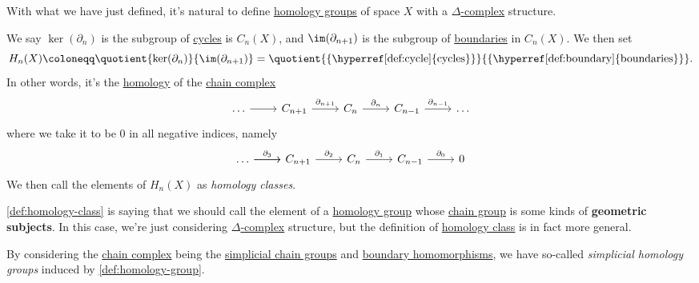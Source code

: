 With what we have just defined, it's natural to define \hyperref[def:homology-group]{homology groups} of space \(X\) with a \hyperref[def:delta-complex]{\(\Delta \)-complex}
structure.
\begin{definition}\label{def:homology-class}
	We say \(\ker  (\partial _{n} )\) is the subgroup of \hyperref[def:cycle]{cycles} is \(C_{n} (X)\), and \(\im (\partial_{n+1}) \) is the
	subgroup of \hyperref[def:boundary]{boundaries} in \(C_{n} (X)\). We then set
	\[
		H_{n} (X)\coloneqq \quotient{\ker  (\partial _{n} )}{\im  (\partial _{n+1})} = \quotient{\{\text{\hyperref[def:cycle]{cycles}}\}}{\{\text{\hyperref[def:boundary]{boundaries}}\}}.
	\]
	In other words, it's the \hyperref[def:homology-group]{homology} of the \hyperref[def:chain-complex]{chain complex}
	\[
		\begin{tikzcd}
			\dots & {C_{n+1}} & {C_{n}} & {C_{n-1}} & \dots
			\arrow[from=1-1, to=1-2]
			\arrow["{\partial_{n+1}}", from=1-2, to=1-3]
			\arrow["{\partial_{n}}", from=1-3, to=1-4]
			\arrow["{\partial_{n-1}}", from=1-4, to=1-5]
		\end{tikzcd}
	\]
	where we take it to be \(0\) in all negative indices, namely
	\[
		\begin{tikzcd}
			\dots & {C_{n+1}} & {C_{n}} & {C_{n-1}} & 0
			\arrow[from=1-1, to=1-2]
			\arrow["{\partial_{3}}", from=1-1, to=1-2]
			\arrow["{\partial_{2}}", from=1-2, to=1-3]
			\arrow["{\partial_{1}}", from=1-3, to=1-4]
			\arrow["{\partial_{0}}", from=1-4, to=1-5]
		\end{tikzcd}
	\]
	We then call the elements of \(H_{n} (X)\) as \emph{homology classes}.
\end{definition}
\begin{remark}
	\autoref{def:homology-class} is saying that we should call the element of a \hyperref[def:homology-group]{homology group} whose \hyperref[def:chain-group]{chain group}
	is some kinds of \textbf{geometric subjects}. In this case, we're just considering \hyperref[def:delta-complex]{\(\Delta \)-complex} structure, but the definition
	of \hyperref[def:homology-class]{homology class} is in fact more general.
\end{remark}

\begin{definition}\label{def:simplicial-homology-group}
	By considering the \hyperref[def:chain-complex]{chain complex} being the \hyperref[def:simplicial-chain-group]{simplicial chain groups}
	and \hyperref[def:boundary-homomorphism]{boundary homomorphisms}, we have so-called \emph{simplicial homology groups} induced by \autoref{def:homology-group}.
\end{definition}